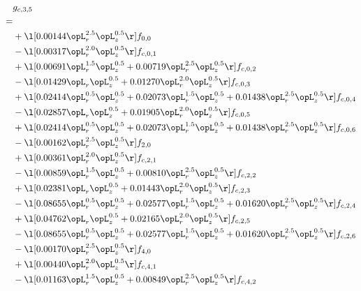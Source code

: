 \begin{alignat}{2} 
\label{eq:g_35_0} 
& g_{c,3,5} \nonumber \\ 
 = \\ 
& + \l[  0.00144 \opL_r^{2.5} \opL_z^{0.5}  \r] f_{0,0} \nonumber \\ 
& - \l[  0.00317 \opL_r^{2.0} \opL_z^{0.5}  \r] f_{c,0,1} \nonumber \\ 
& + \l[  0.00691 \opL_r^{1.5} \opL_z^{0.5} +  0.00719 \opL_r^{2.5} \opL_z^{0.5}  \r] f_{c,0,2} \nonumber \\ 
& - \l[  0.01429 \opL_r \opL_z^{0.5} +  0.01270 \opL_r^{2.0} \opL_z^{0.5}  \r] f_{c,0,3} \nonumber \\ 
& + \l[  0.02414 \opL_r^{0.5} \opL_z^{0.5} +  0.02073 \opL_r^{1.5} \opL_z^{0.5} +  0.01438 \opL_r^{2.5} \opL_z^{0.5}  \r] f_{c,0,4} \nonumber \\ 
& - \l[  0.02857 \opL_r \opL_z^{0.5} +  0.01905 \opL_r^{2.0} \opL_z^{0.5}  \r] f_{c,0,5} \nonumber \\ 
& + \l[  0.02414 \opL_r^{0.5} \opL_z^{0.5} +  0.02073 \opL_r^{1.5} \opL_z^{0.5} +  0.01438 \opL_r^{2.5} \opL_z^{0.5}  \r] f_{c,0,6} \nonumber \\ 
& - \l[  0.00162 \opL_r^{2.5} \opL_z^{0.5}  \r] f_{2,0} \nonumber \\ 
& + \l[  0.00361 \opL_r^{2.0} \opL_z^{0.5}  \r] f_{c,2,1} \nonumber \\ 
& - \l[  0.00859 \opL_r^{1.5} \opL_z^{0.5} +  0.00810 \opL_r^{2.5} \opL_z^{0.5}  \r] f_{c,2,2} \nonumber \\ 
& + \l[  0.02381 \opL_r \opL_z^{0.5} +  0.01443 \opL_r^{2.0} \opL_z^{0.5}  \r] f_{c,2,3} \nonumber \\ 
& - \l[  0.08655 \opL_r^{0.5} \opL_z^{0.5} +  0.02577 \opL_r^{1.5} \opL_z^{0.5} +  0.01620 \opL_r^{2.5} \opL_z^{0.5}  \r] f_{c,2,4} \nonumber \\ 
& + \l[  0.04762 \opL_r \opL_z^{0.5} +  0.02165 \opL_r^{2.0} \opL_z^{0.5}  \r] f_{c,2,5} \nonumber \\ 
& - \l[  0.08655 \opL_r^{0.5} \opL_z^{0.5} +  0.02577 \opL_r^{1.5} \opL_z^{0.5} +  0.01620 \opL_r^{2.5} \opL_z^{0.5}  \r] f_{c,2,6} \nonumber \\ 
& - \l[  0.00170 \opL_r^{2.5} \opL_z^{0.5}  \r] f_{4,0} \nonumber \\ 
& + \l[  0.00440 \opL_r^{2.0} \opL_z^{0.5}  \r] f_{c,4,1} \nonumber \\ 
& - \l[  0.01163 \opL_r^{1.5} \opL_z^{0.5} +  0.00849 \opL_r^{2.5} \opL_z^{0.5}  \r] f_{c,4,2} \nonumber \\ 

\end{alignat}
